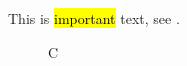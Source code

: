 \documentclass{mdpi}
\begin{document}
This is \hl{important} text, see .
\begin{figure}\caption{C}\label{f1}\end{figure}
\end{document}
